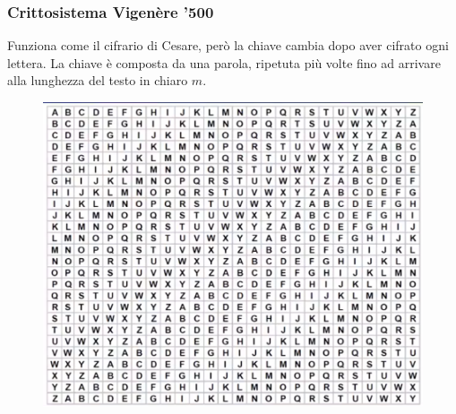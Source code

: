 \newpage

\subsubsection*{Crittosistema Vigenère '500}

Funziona come il cifrario di Cesare, però la chiave cambia dopo aver cifrato ogni lettera.
La chiave è composta da una parola, ripetuta più volte fino ad arrivare alla lunghezza del testo in chiaro $m$.

\begin{figure}[h]
	\centering
	\includegraphics[width=0.8\linewidth]{immagini/img33}
\end{figure}

